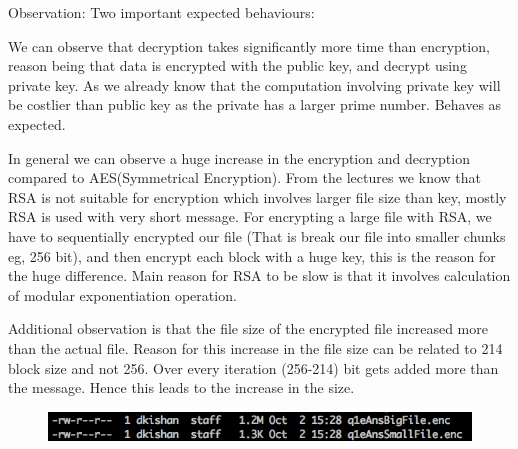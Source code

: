 \documentclass[12pt]{article}%
\begin{document}
Observation:
Two important expected behaviours:

We can observe that decryption takes significantly more time than encryption, reason being that data is encrypted with the public key, and decrypt using private key. As we already know that the computation involving private key will be costlier than public key as the private has a larger prime number. Behaves as expected.

In general we can observe a huge increase in the encryption and decryption compared to AES(Symmetrical Encryption). From the lectures we know that RSA is not suitable for encryption which involves larger file size than key, mostly RSA is used with very short message. For encrypting a large file with RSA, we have to sequentially encrypted our file (That is break our file into smaller chunks eg, 256 bit), and then encrypt each block with a huge key, this  is the reason for the huge difference. Main reason for RSA to be slow is that it involves calculation of modular exponentiation operation.

Additional observation is that the file size of the encrypted file increased more than the actual file. Reason for this increase in the file size can be related to 214 block size and not 256. Over every iteration (256-214) bit gets added more than the message. Hence this leads to the increase in the size.

\begin{figure}[h]
    \centering
	\includegraphics[scale=0.5]{4}
\end{figure}
\end{document}
